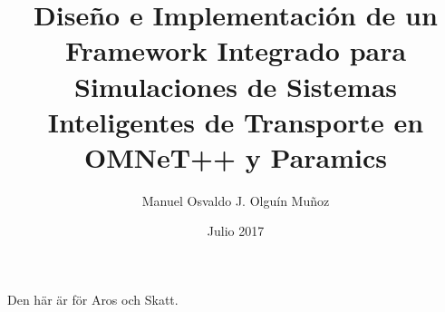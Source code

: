 \documentclass[upright, contnum]{umemoria}
\author{Manuel Osvaldo J. Olguín Muñoz}
\title{Diseño e Implementación de un Framework Integrado para Simulaciones de Sistemas Inteligentes de Transporte en OMNeT++ y Paramics}
\date{Julio 2017}
\begin{document}
\frontmatter
\maketitle

\begin{abstract}
\lipsum[1-4]
\end{abstract}

\begin{dedicatoria}
Den här är för Aros och Skatt.
\end{dedicatoria}

\begin{thanks}
\lipsum[1-2]
\end{thanks}

\cleardoublepage
\tableofcontents
\cleardoublepage
\listoftables
\cleardoublepage
\listoffigures

\mainmatter






\blankpage
\cleardoublepage

\printbibliography[heading=bibintoc]
    

\appendix

\end{document}
